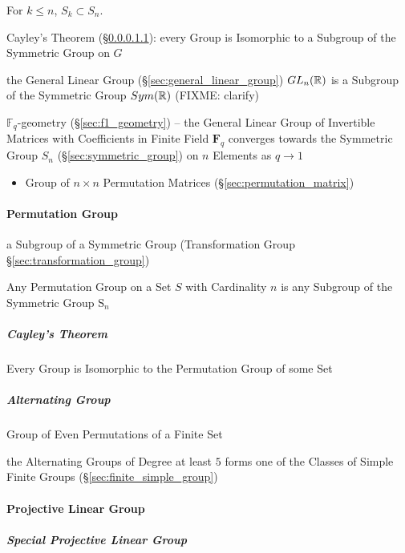For $k \leq n$, $S_k \subset S_n$.

Cayley's Theorem (\S\ref{sec:cayleys_theorem}): every Group is Isomorphic to a
Subgroup of the Symmetric Group on $G$

\fist the General Linear Group (\S\ref{sec:general_linear_group}) $GL_n(\mathbb{R})$
is a Subgroup of the Symmetric Group $Sym(\mathbb{R})$ (FIXME: clarify)

\fist $\mathbb{F}_q$-geometry (\S\ref{sec:f1_geometry}) -- the General Linear
Group of Invertible Matrices with Coefficients in Finite Field $\mathbf{F}_q$
converges towards the Symmetric Group $S_n$ (\S\ref{sec:symmetric_group}) on $n$
Elements as $q \rightarrow 1$

\begin{itemize}
  \item Group of $n \times n$ Permutation Matrices
    (\S\ref{sec:permutation_matrix})
\end{itemize}



\paragraph{Permutation Group}\label{sec:permutation_group}\hfill

a Subgroup of a Symmetric Group (Transformation Group
\S\ref{sec:transformation_group})

Any Permutation Group on a Set $S$ with Cardinality $n$ is any Subgroup of the
Symmetric Group $\mathrm{S}_n$



\subparagraph{Cayley's Theorem}\label{sec:cayleys_theorem}\hfill

Every Group is Isomorphic to the Permutation Group of some Set



\subparagraph{Alternating Group}\label{sec:alternating_group}\hfill

Group of Even Permutations of a Finite Set

the Alternating Groups of Degree at least $5$ forms one of the Classes of Simple
Finite Groups (\S\ref{sec:finite_simple_group})



\paragraph{Projective Linear Group}\label{sec:projective_linear_group}\hfill

\subparagraph{Special Projective Linear Group}
\label{sec:special_projective_linear_group}\hfill




